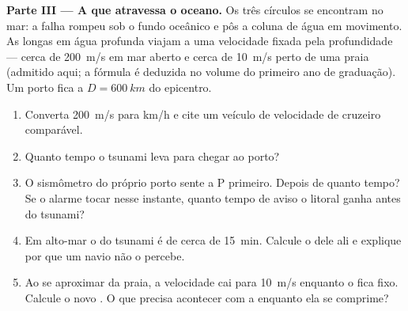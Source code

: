 \begin{problem}
\medskip
\noindent\textbf{Parte III --- A  que atravessa o oceano.}
Os três círculos se encontram no mar: a falha rompeu sob o fundo oceânico
e pôs a coluna de água em movimento. As  longas em água profunda
viajam a uma velocidade fixada pela profundidade --- cerca de
\qty{200}{m/s} em mar aberto e cerca de \qty{10}{m/s} perto de uma praia
(admitido aqui; a fórmula é deduzida no volume do primeiro ano de
graduação). Um porto fica a $D = \qty{600}{km}$ do epicentro.
\begin{enumerate}[resume]
  \item Converta \qty{200}{m/s} para \unit{km/h} e cite um veículo de
        velocidade de cruzeiro comparável.
  \item Quanto tempo o tsunami leva para chegar ao porto?
  \item O sismômetro do próprio porto sente a  P primeiro. Depois de
        quanto tempo? Se o alarme tocar nesse instante, quanto tempo de
        aviso o litoral ganha antes do tsunami?
  \item Em alto-mar o  do tsunami é de cerca de \qty{15}{min}.
        Calcule o  dele ali e explique por que um
        navio não o percebe.
  \item Ao se aproximar da praia, a velocidade cai para \qty{10}{m/s}
        enquanto o  fica fixo. Calcule o novo .
        O que precisa acontecer com a  enquanto ela se comprime?
\end{enumerate}


\end{problem}
